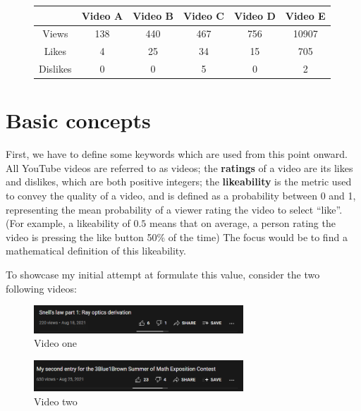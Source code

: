 \documentclass[a4paper,11pt]{article}
\begin{document}
\begin{figure}[H]
    \centering
    \begin{tabular}{c|c|c|c|c|c}
        & Video A & Video B & Video C & Video D & Video E \\
        \hline
        \hline
        Views & 138 & 440 & 467 & 756 & 10907 \\
        \hline
        Likes & 4 & 25 & 34 & 15 & 705 \\
        \hline
        Dislikes & 0 & 0 & 5 & 0 & 2
    \end{tabular}
    \label{tbl:videos}
\end{figure}


\section{Basic concepts}

First, we have to define some keywords which are used from this point onward. All YouTube videos are referred to as videos; the \textbf{ratings} of a video are its likes and dislikes, which are both positive integers; the \textbf{likeability} is the metric used to convey the quality of a video, and is defined as a probability between 0 and 1, representing the mean probability of a viewer rating the video to select ``like''. (For example, a likeability of $0.5$ means that on average, a person rating the video is pressing the like button 50\% of the time) The focus would be to find a mathematical definition of this likeability.

To showcase my initial attempt at formulate this value, consider the two following videos:

\begin{figure}[H]
    \centering
    \includegraphics[width=0.7\textwidth]{assets/s_vid2.png}
    \caption{Video one \parencite{fluency_2021}}
    \label{fig:vid1}
\end{figure}

\begin{figure}[H]
    \centering
    \includegraphics[width=0.7\textwidth]{assets/s_vid1.png}
    \caption{Video two \parencite{division_2021}}
    \label{fig:vid2}
\end{figure}
\end{document}

